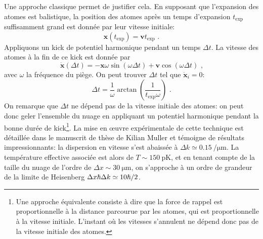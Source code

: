 Une approche classique permet de justifier cela. En supposant que l'expansion des atomes est balistique, la position des atomes après un temps d'expansion $t_{\mathrm{exp}}$ suffisamment grand est donnée par leur vitesse initiale:
\begin{equation}
\mathbf{x}(t_{\mathrm{exp}})=\mathbf{v} t_{\mathrm{exp}} \text{ .}
\end{equation}
Appliquons un kick de potentiel harmonique pendant un temps $\Delta t$. La vitesse des atomes à la fin de ce kick est donnée par
\begin{equation}
\dot{\mathbf{x}}(\Delta t) = -\mathbf{x} \omega \sin{(\omega \Delta t)}+ \mathbf{v} \cos{(\omega \Delta t)} \text{ ,}
\end{equation}
avec $\omega$ la fréquence du piège.
On peut trouver $\Delta t$ tel que $\dot{\mathbf{x}}_i=0$:
\begin{equation}
\Delta t= \frac{1}{\omega} \arctan{\left(\frac{1}{t_{\mathrm{exp}} \omega} \right)} \text{ .}
\end{equation}
On remarque que $\Delta t$ ne dépend pas de la vitesse initiale des atomes: on peut donc geler l'ensemble du nuage en appliquant un potentiel harmonique pendant la bonne durée de kick\footnote{Une approche équivalente consiste à dire que la force de rappel est proportionnelle à la distance parcourue par les atomes, qui est proportionnelle à la vitesse initiale. L'instant où les vitesses s'annulent ne dépend donc pas de la vitesse initiale des atomes.}. 
La mise en œuvre expérimentale de cette technique est détaillée dans le manuscrit de thèse de Kilian Muller \citep{muller2015coherent} et témoigne de résultats impressionnants: la dispersion en vitesse s'est abaissée à $\Delta k \simeq \SI{0.15}{\per\micro\metre}$. La température effective associée est alors de $T\sim \SI{150}{\pico\kelvin}$, et en tenant compte de la taille du nuage de l'ordre de $\Delta x \sim \SI{30}{\micro\metre}$, on s'approche à un ordre de grandeur de la limite de Heisenberg $\Delta x \hslash \Delta k \simeq 10 \hslash /2$.

